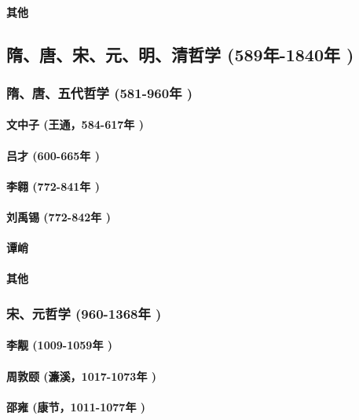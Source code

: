 \documentclass[UTF8]{../RepresentationUniverse}
\begin{document}
        \paragraph{其他}

\subsection{隋、唐、宋、元、明、清哲学 (589年-1840年 )}
    \subsubsection{隋、唐、五代哲学 (581-960年 )}
        \paragraph{文中子 (王通，584-617年 )}
        \paragraph{吕才 (600-665年 )}
        \paragraph{李翱 (772-841年 )}
        \paragraph{刘禹锡 (772-842年 )}
        \paragraph{谭峭}
        \paragraph{其他}

    \subsubsection{宋、元哲学 (960-1368年 )}
        \paragraph{李觏 (1009-1059年 )}
        \paragraph{周敦颐 (濂溪，1017-1073年 )}
        \paragraph{邵雍 (康节，1011-1077年 )}
\end{document}
